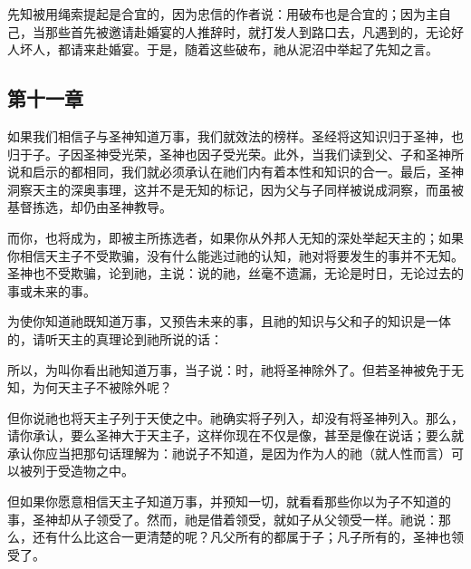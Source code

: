 先知被用绳索提起是合宜的，因为忠信的作者说：用破布也是合宜的；因为主自己，当那些首先被邀请赴婚宴的人推辞时，就打发人到路口去，凡遇到的，无论好人坏人，都请来赴婚宴。于是，随着这些破布，祂从泥沼中举起了先知之言。\par


\subsection{第十一章}

如果我们相信子与圣神知道万事，我们就效法的榜样。圣经将这知识归于圣神，也归于子。子因圣神受光荣，圣神也因子受光荣。此外，当我们读到父、子和圣神所说和启示的都相同，我们就必须承认在祂们内有着本性和知识的合一。最后，圣神洞察天主的深奥事理，这并不是无知的标记，因为父与子同样被说成洞察，而虽被基督拣选，却仍由圣神教导。\par

而你，也将成为，即被主所拣选者，如果你从外邦人无知的深处举起天主的；如果你相信天主子不受欺骗，没有什么能逃过祂的认知，祂对将要发生的事并不无知。圣神也不受欺骗，论到祂，主说：说的祂，丝毫不遗漏，无论是时日，无论过去的事或未来的事。\par

为使你知道祂既知道万事，又预告未来的事，且祂的知识与父和子的知识是一体的，请听天主的真理论到祂所说的话：\par

所以，为叫你看出祂知道万事，当子说：时，祂将圣神除外了。但若圣神被免于无知，为何天主子不被除外呢？\par

但你说祂也将天主子列于天使之中。祂确实将子列入，却没有将圣神列入。那么，请你承认，要么圣神大于天主子，这样你现在不仅是像，甚至是像在说话；要么就承认你应当把那句话理解为：祂说子不知道，是因为作为人的祂（就人性而言）可以被列于受造物之中。\par

但如果你愿意相信天主子知道万事，并预知一切，就看看那些你以为子不知道的事，圣神却从子领受了。然而，祂是借着领受，就如子从父领受一样。祂说：那么，还有什么比这合一更清楚的呢？凡父所有的都属于子；凡子所有的，圣神也领受了。\par

